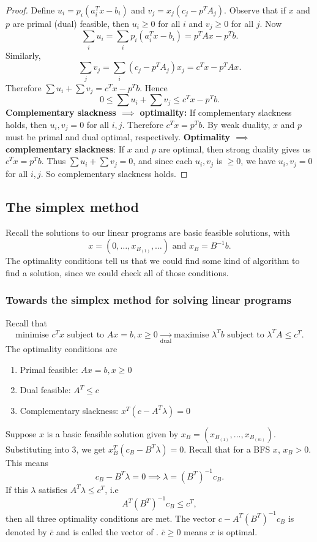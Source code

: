 \documentclass[a4paper]{scrartcl}
\begin{document}
\begin{proof}
	 Define $u_i=p_i (a_i^T x - b_i)$ and $v_j=x_j(c_j-p^T A_j)$.\newline 
	 Observe that if $x$ and $p$ are primal (dual) feasible, then $u_i \geq 0$ for all $i$ and $v_j \geq 0$ for all $j$. Now 
	 \[\sum_{i}u_i=\sum_{i} p_i (a_i^T x - b_i) =p^T A x-p^T b.\]
	 Similarly,
	 \[\sum_{j}v_j=\sum_{i} (c_j-p^T A_j)x_j =c^Tx-p^T A x.\]
	 Therefore $\sum u_i+ \sum v_j=c^T x -p^T b$. Hence 
	 \[0 \leq \sum u_i+ \sum v_j \leq c^T x -p^T b.\]
	 \textbf{Complementary slackness $\implies $ optimality:}\newline 
	 If complementary slackness holds, then $u_i,v_j=0$ for all $i,j$. Therefore $c^T x=p^T b$. By weak duality, $x$ and $p$ must be primal and dual optimal, respectively.\newline 
	 \textbf{Optimality $\implies $ complementary slackness}:\newline 
	 If $x$ and $p$ are optimal, then strong duality gives us $c^T x =p^T b$. Thus $\sum u_i+ \sum v_j=0$, and since each $u_i,v_j$ is $\geq 0$, we have $u_i, v_j=0$ for all $i,j$. So complementary slackness holds.
\end{proof}

\subsection{The simplex method}
Recall the solutions to our linear programs are basic feasible solutions, with 
\[x=(0,\ldots,x_{B_{(1)}},\ldots) \text{ and } x_B =B^{-1}b.\]
The optimality conditions tell us that we could find some kind of algorithm to find a solution, since we could check all of those conditions.

\subsubsection{Towards the simplex method for solving linear programs}
Recall that 
\[\text{minimise }c^Tx \text{ subject to } Ax=b, x \geq 0 \underset{\text{dual} }{\to}  \text{maximise }\lambda^T b \text{ subject to } \lambda^TA \leq c^T.\]
The optimality conditions are 
\begin{enumerate}
	\item Primal feasible: $Ax=b, x \geq 0$
	\item Dual feasible: $A^T \leq c$
	\item Complementary slackness: $x^T (c-A^T \lambda)=0$
\end{enumerate}
Suppose $x$ is a basic feasible solution given by $x_B=(x_{B_{(1)}},\ldots ,x_{B_{(m)}})$. Substituting into 3, we get $x_B^T (c_B-B^T \lambda)=0$. Recall that for a BFS $x$, $x_B>0$. This means 
\[c_B-B^T\lambda=0 \implies \lambda={(B^T)}^{-1}c_B.\]
If this $\lambda$ satisfies $A^T \lambda \leq c^T$, i.e 
\[A^T {(B^T)}^{-1} c_B \leq c^T,\]
then all three optimality conditions are met. The vector $c-A^T {(B^T)}^{-1}c_B$ is denoted by $\bar{c}$ and is called the vector of . $\bar{c} \geq 0$ means $x$ is optimal.
\end{document}
